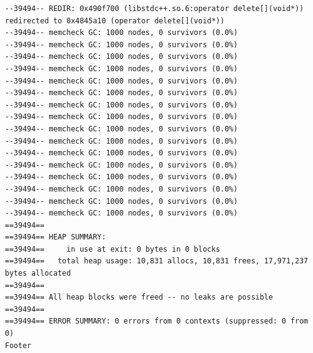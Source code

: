 \documentclass[a4paper,11pt]{article}
\begin{document}
\begin{lstlisting}
--39494-- REDIR: 0x490f700 (libstdc++.so.6:operator delete[](void*)) redirected to 0x4845a10 (operator delete[](void*))
--39494-- memcheck GC: 1000 nodes, 0 survivors (0.0%)
--39494-- memcheck GC: 1000 nodes, 0 survivors (0.0%)
--39494-- memcheck GC: 1000 nodes, 0 survivors (0.0%)
--39494-- memcheck GC: 1000 nodes, 0 survivors (0.0%)
--39494-- memcheck GC: 1000 nodes, 0 survivors (0.0%)
--39494-- memcheck GC: 1000 nodes, 0 survivors (0.0%)
--39494-- memcheck GC: 1000 nodes, 0 survivors (0.0%)
--39494-- memcheck GC: 1000 nodes, 0 survivors (0.0%)
--39494-- memcheck GC: 1000 nodes, 0 survivors (0.0%)
--39494-- memcheck GC: 1000 nodes, 0 survivors (0.0%)
--39494-- memcheck GC: 1000 nodes, 0 survivors (0.0%)
--39494-- memcheck GC: 1000 nodes, 0 survivors (0.0%)
--39494-- memcheck GC: 1000 nodes, 0 survivors (0.0%)
--39494-- memcheck GC: 1000 nodes, 0 survivors (0.0%)
--39494-- memcheck GC: 1000 nodes, 0 survivors (0.0%)
--39494-- memcheck GC: 1000 nodes, 0 survivors (0.0%)
==39494== 
==39494== HEAP SUMMARY:
==39494==     in use at exit: 0 bytes in 0 blocks
==39494==   total heap usage: 10,831 allocs, 10,831 frees, 17,971,237 bytes allocated
==39494== 
==39494== All heap blocks were freed -- no leaks are possible
==39494== 
==39494== ERROR SUMMARY: 0 errors from 0 contexts (suppressed: 0 from 0)
Footer
	\end{lstlisting}
\end{document}
